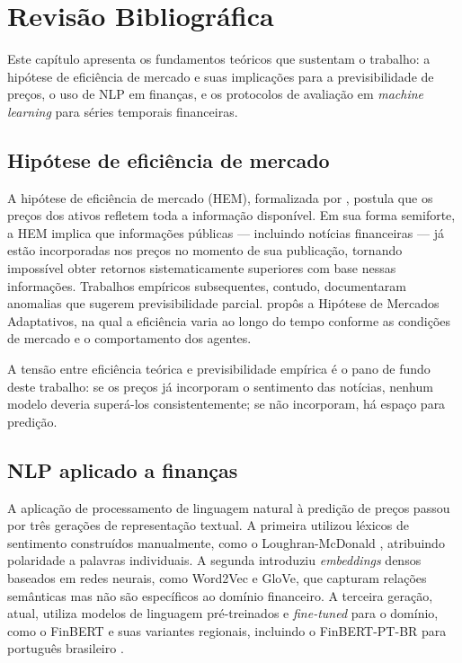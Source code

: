 \documentclass[
    12pt,
    openright,
    oneside,
    a4paper,
    english,
    brazil
]{abntex2}
\begin{document}
\chapter{Revisão Bibliográfica}\label{cap:revisao}

Este capítulo apresenta os fundamentos teóricos que sustentam o trabalho: a hipótese de eficiência de mercado e suas implicações para a previsibilidade de preços, o uso de NLP em finanças, e os protocolos de avaliação em \textit{machine learning} para séries temporais financeiras.

\section{Hipótese de eficiência de mercado}

A hipótese de eficiência de mercado (HEM), formalizada por , postula que os preços dos ativos refletem toda a informação disponível. Em sua forma semiforte, a HEM implica que informações públicas --- incluindo notícias financeiras --- já estão incorporadas nos preços no momento de sua publicação, tornando impossível obter retornos sistematicamente superiores com base nessas informações. Trabalhos empíricos subsequentes, contudo, documentaram anomalias que sugerem previsibilidade parcial.  propôs a Hipótese de Mercados Adaptativos, na qual a eficiência varia ao longo do tempo conforme as condições de mercado e o comportamento dos agentes.

A tensão entre eficiência teórica e previsibilidade empírica é o pano de fundo deste trabalho: se os preços já incorporam o sentimento das notícias, nenhum modelo deveria superá-los consistentemente; se não incorporam, há espaço para predição.

\section{NLP aplicado a finanças}

A aplicação de processamento de linguagem natural à predição de preços passou por três gerações de representação textual. A primeira utilizou léxicos de sentimento construídos manualmente, como o Loughran-McDonald \cite{loughran2011}, atribuindo polaridade a palavras individuais. A segunda introduziu \textit{embeddings} densos baseados em redes neurais, como Word2Vec e GloVe, que capturam relações semânticas mas não são específicos ao domínio financeiro. A terceira geração, atual, utiliza modelos de linguagem pré-treinados e \textit{fine-tuned} para o domínio, como o FinBERT \cite{araci2019} e suas variantes regionais, incluindo o FinBERT-PT-BR para português brasileiro \cite{souza2023}.
\end{document}
